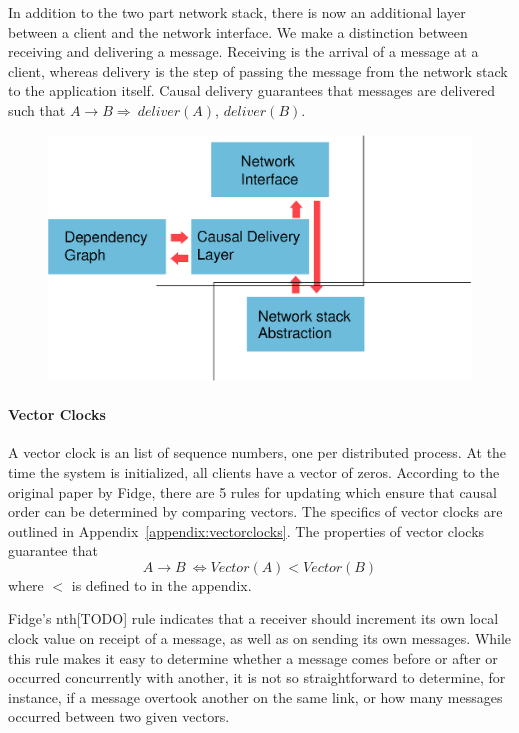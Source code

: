 \documentclass[12pt,a4paper,twoside,openright]{report}
\begin{document}
		In addition to the two part network stack, there is now an additional layer between a client and the network interface. We make a distinction between receiving and delivering a message. Receiving is the arrival of a message at a client, whereas delivery is the step of passing the message from the network stack to the application itself. Causal delivery guarantees that messages are delivered such that $A \rightarrow B \Rightarrow\ deliver(A)$, $deliver(B)$.
		
				
	\begin{figure}[H]
	\centering
	\includegraphics[width=1\linewidth]{figs/causal_arch.eps}
	\caption[Ensuring Causal Delivery]{}
	\label{fig:causal}
	\end{figure}

		
		\paragraph{Vector Clocks}
		A vector clock is an list of sequence numbers, one per distributed process. At the time the system is initialized, all clients have a vector of zeros. According to the original paper by Fidge, there are 5 rules for updating which ensure that causal order can be determined by comparing vectors. The specifics of vector clocks are outlined in Appendix~\ref{appendix:vectorclocks}. The properties of vector clocks guarantee that \[ A \rightarrow B\ \Leftrightarrow Vector(A) < Vector(B)\] where $<$ is defined to in the appendix.
		
		Fidge's nth[TODO] rule indicates that a receiver should increment its own local clock value on receipt of a message, as well as on sending its own messages. While this rule makes it easy to determine whether a message comes before or after or occurred concurrently with another, it is not so straightforward to determine, for instance, if a message overtook another on the same link, or how many messages occurred between two given vectors.
		
\end{document}

